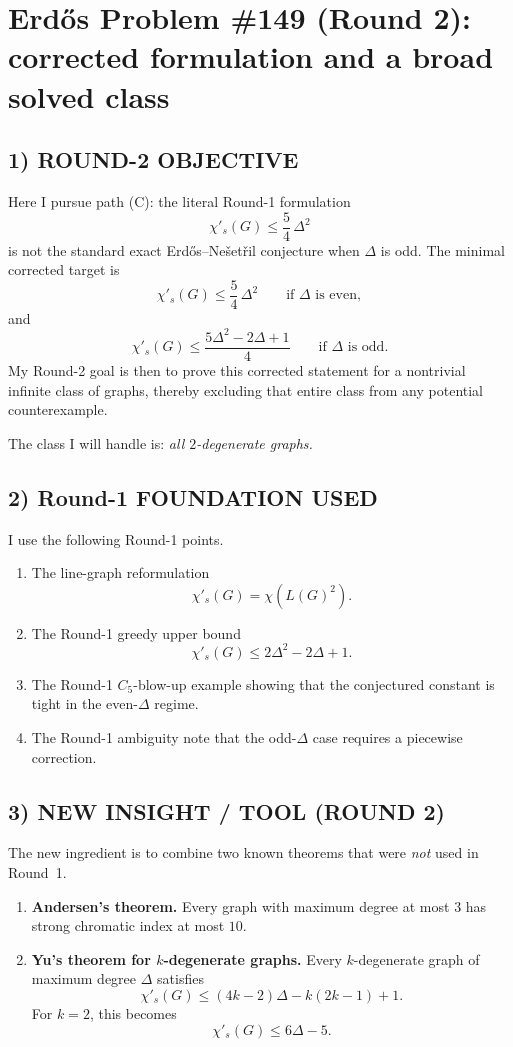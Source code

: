 
\section{Erd\H{o}s Problem \#149 (Round 2): corrected formulation and a broad solved class}

\subsection*{1) ROUND-2 OBJECTIVE}
Here I pursue path (C): the literal Round-1 formulation
\[
\chi'_s(G)\le \frac54\,\Delta^2
\]
is not the standard exact Erd\H{o}s--Ne\v{s}et\v{r}il conjecture when $\Delta$ is odd. The minimal corrected target is
\[
\chi'_s(G)\le \frac54\,\Delta^2 \qquad \mbox{if $\Delta$ is even},
\]
and
\[
\chi'_s(G)\le \frac{5\Delta^2-2\Delta+1}{4} \qquad \mbox{if $\Delta$ is odd}.
\]
My Round-2 goal is then to prove this corrected statement for a nontrivial infinite class of graphs, thereby excluding that entire class from any potential counterexample.

The class I will handle is: \emph{all $2$-degenerate graphs.}

\subsection*{2) Round-1 FOUNDATION USED}
I use the following Round-1 points.

\begin{enumerate}
\item The line-graph reformulation
\[
\chi'_s(G)=\chi(L(G)^2).
\]
\item The Round-1 greedy upper bound
\[
\chi'_s(G)\le 2\Delta^2-2\Delta+1.
\]
\item The Round-1 $C_5$-blow-up example showing that the conjectured constant is tight in the even-$\Delta$ regime.
\item The Round-1 ambiguity note that the odd-$\Delta$ case requires a piecewise correction.
\end{enumerate}

\subsection*{3) NEW INSIGHT / TOOL (ROUND 2)}
The new ingredient is to combine two known theorems that were \emph{not} used in Round~1.

\begin{enumerate}
\item \textbf{Andersen's theorem.} Every graph with maximum degree at most $3$ has strong chromatic index at most $10$.
\item \textbf{Yu's theorem for $k$-degenerate graphs.} Every $k$-degenerate graph of maximum degree $\Delta$ satisfies
\[
\chi'_s(G)\le (4k-2)\Delta-k(2k-1)+1.
\]
For $k=2$, this becomes
\[
\chi'_s(G)\le 6\Delta-5.
\]
\end{enumerate}

